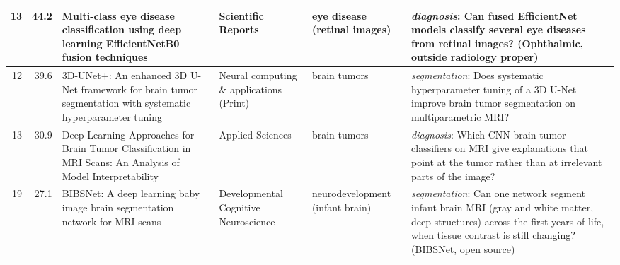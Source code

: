 \documentclass[aspectratio=169]{beamer}
\begin{document}
\begin{frame}
\begin{adjustbox}{max totalsize={\textwidth}{0.74\textheight}}
\begin{tabular}{|r|r|>{\raggedright\arraybackslash}p{}|>{\raggedright\arraybackslash}p{}|>{\raggedright\arraybackslash}p{}|>{\raggedright\arraybackslash}p{}|}
13 & 44.2 & Multi-class eye disease classification using deep learning EfficientNetB0 fusion techniques & Scientific Reports & eye disease (retinal images) & \textit{diagnosis}: Can fused EfficientNet models classify several eye diseases from retinal images? (Ophthalmic, outside radiology proper) \\ \hline
12 & 39.6 & 3D-UNet+: An enhanced 3D U-Net framework for brain tumor segmentation with systematic hyperparameter tuning & Neural computing \& applications (Print) & brain tumors & \textit{segmentation}: Does systematic hyperparameter tuning of a 3D U-Net improve brain tumor segmentation on multiparametric MRI? \\ \hline
13 & 30.9 & Deep Learning Approaches for Brain Tumor Classification in MRI Scans: An Analysis of Model Interpretability & Applied Sciences & brain tumors & \textit{diagnosis}: Which CNN brain tumor classifiers on MRI give explanations that point at the tumor rather than at irrelevant parts of the image? \\ \hline
19 & 27.1 & BIBSNet: A deep learning baby image brain segmentation network for MRI scans & Developmental Cognitive Neuroscience & neurodevelopment (infant brain) & \textit{segmentation}: Can one network segment infant brain MRI (gray and white matter, deep structures) across the first years of life, when tissue contrast is still changing? (BIBSNet, open source) \\ \hline
\end{tabular}
\end{adjustbox}
\\[1pt]
\end{frame}
\end{document}
